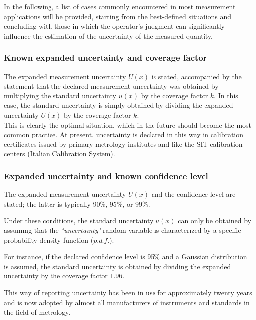 \documentclass[../main.tex]{subfiles}
\begin{document}
In the following, a list of cases commonly encountered in most measurement applications will be provided, starting from the best-defined situations and concluding with those in which the operator’s judgment can significantly influence the estimation of the uncertainty of the measured quantity.\\

\subsubsection*{Known expanded uncertainty and coverage factor}

The expanded measurement uncertainty $U(x)$ is stated, accompanied by the statement that the declared measurement uncertainty was obtained by multiplying the standard uncertainty $u(x)$ by the coverage factor $k$. 
In this case, the standard uncertainty is simply obtained by dividing the expanded uncertainty $U(x)$ by the coverage factor $k$.\\

This is clearly the optimal situation, which in the future should become the most common practice. At present, uncertainty is declared in this way in calibration certificates issued by primary metrology institutes and like the SIT calibration centers (Italian Calibration System).\\


\subsubsection*{Expanded uncertainty and known confidence level}


The expanded measurement uncertainty $U(x)$ and the confidence level are stated; the latter is typically 90\%, 95\%, or 99\%. 

Under these conditions, the standard uncertainty $u(x)$ can only be obtained by assuming that the \textit{"uncertainty"} random variable is characterized by a specific probability density function ($p.d.f.$).

For instance, if the declared confidence level is 95\% and a Gaussian distribution is assumed, the standard uncertainty is obtained by dividing the expanded uncertainty by the coverage factor 1.96.

This way of reporting uncertainty has been in use for approximately twenty years and is now adopted by almost all manufacturers of instruments and standards in the field of metrology.\\
\end{document}
